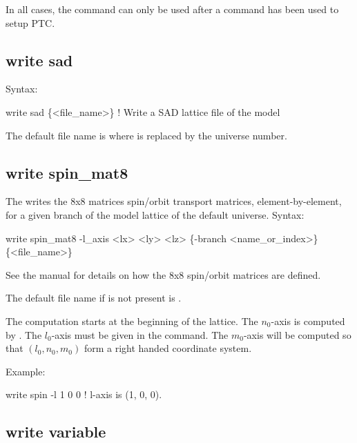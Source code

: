 {{{{{{{{{{{In all cases, the  command can only be used after a  command has been
used to setup PTC.


\subsection{write sad}
\label{s:write.sad}

Syntax:
\begin{example}
  write sad \{<file_name>\}  ! Write a SAD lattice file of the model
\end{example}

The default file name is  where \vn{\#} is replaced by the universe number. 


\subsection{write spin_mat8}
\label{s:write.spin.mat8}

The  writes the 8x8 matrices spin/orbit transport matrices, element-by-element, for
a given branch of the model lattice of the default universe.
Syntax:
\begin{example}
  write spin_mat8 -l_axis <lx> <ly> <lz> \{-branch <name_or_index>\} \{<file_name>\}
\end{example}
See the \bmad manual for details on how the 8x8 spin/orbit matrices are defined. 

The default file name if  is not present is .

The computation starts at the beginning of the lattice. The $n_0$-axis is computed by \bmad. The
$l_0$-axis must be given in the  command.  The $m_0$-axis will be computed so
that $(l_0, n_0, m_0)$ form a right handed coordinate system.

Example:
\begin{example}
  write spin -l 1 0 0    ! l-axis is (1, 0, 0).
\end{example}


\subsection{write variable}
\label{s:write.variable}

}}}}}}}}}}}
